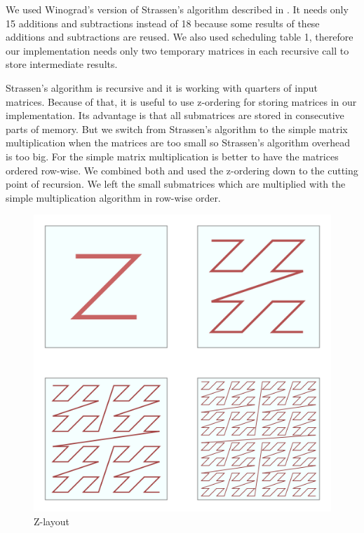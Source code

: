 \documentclass{article}
\begin{document}
We used Winograd's version of Strassen’s algorithm described in \cite{boyer2009memory}.
It needs only 15 additions and subtractions instead of 18 because some results of 
these additions and subtractions are reused. We also used scheduling table 1, 
therefore our implementation needs only two temporary matrices in each recursive call
to store intermediate results.

Strassen’s algorithm is recursive and it is working with quarters of input matrices.
Because of that, it is useful to use z-ordering for storing matrices in our implementation.
Its advantage is that all submatrices are stored in consecutive parts of memory.
But we switch from Strassen’s algorithm to the simple matrix multiplication
when the matrices are too small so Strassen’s algorithm overhead is too big.
For the simple matrix multiplication is better to have the matrices ordered row-wise.
We combined both and used the z-ordering down to the cutting point of recursion.
We left the small submatrices which are multiplied with the simple multiplication algorithm
in row-wise order. %

\begin{figure}[htbp]
\centerline{\includegraphics[scale=.2]{morton_order.png}}
\caption{Z-layout}
\label{fig}
\end{figure}
\end{document}
